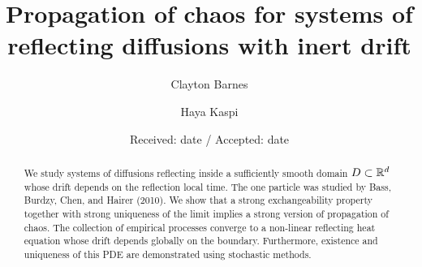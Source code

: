 %

%
%

%


\title{Propagation of chaos for systems of reflecting diffusions with inert drift%
}


\author{Clayton Barnes         \and
        Haya Kaspi %
}



\date{Received: date / Accepted: date}


\maketitle

\begin{abstract}
We study systems of diffusions reflecting inside a sufficiently smooth domain $D \subset \mathbb{R}^d$ whose drift
depends on the reflection local time. The one particle was studied by Bass, Burdzy, Chen, and Hairer (2010). We show that a strong exchangeability property together with strong uniqueness of the limit implies a strong version of propagation of chaos. The collection of empirical processes converge to a non-linear reflecting heat equation whose drift depends globally on the boundary. Furthermore, existence and uniqueness of this PDE are demonstrated using stochastic methods.

\end{abstract}

